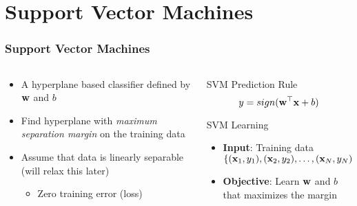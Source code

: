 \documentclass[10pt]{beamer}
\begin{document}
\section{Support Vector Machines}
\begin{frame}
      {
        \frametitle{Support Vector Machines}
      }
      \begin{columns}
        \begin{column}{0.5\textwidth}
          \begin{itemize}
          \item A hyperplane based classifier defined by ${\bf w}$ and $b$
          \item Find hyperplane with {\em maximum separation margin} on the training data
          \item Assume that data is linearly separable (will relax this later)
            \begin{itemize}
            \item Zero training error (loss)
            \end{itemize}
      \end{itemize}
        \end{column}
        \begin{column}{0.5\textwidth}
          \begin{block}{SVM Prediction Rule}
            \[
            y = sign({\bf w}^\top{\bf x} + b)
            \]
          \end{block}
          \begin{block}{SVM Learning}
            \begin{itemize}
            \item {\bf Input}: Training data $\{({\bf x}_1,y_1),({\bf x}_2,y_2),\ldots,({\bf x}_N,y_N)\}$
            \item {\bf Objective}: Learn ${\bf w}$ and $b$ that maximizes the margin
            \end{itemize}
          \end{block}
        \end{column}
      \end{columns}
\end{frame}
\end{document}
